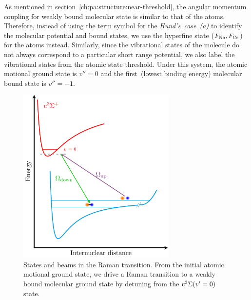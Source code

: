 As mentioned in section~\ref{ch:pa:structure:near-threshold},
the angular momentum coupling for weakly bound molecular state is similar to that of the atoms.
Therefore, instead of using the term symbol for the \textit{Hund's~case~(a)}
to identify the molecular potential and bound states,
we use the hyperfine state ($F_{\mathrm{Na}}, F_{\mathrm{Cs}}$) for the atoms instead.
Similarly, since the vibrational states of the molecule do not always correspond to
a particular short range potential, we also label the vibrational states
from the atomic state threshold.
Under this system, the atomic motional ground state is $v''=0$ and
the first~(lowest binding energy) molecular bound state is $v''=-1$.

\begin{figure}
  \centering
  \includegraphics[width=0.7\textwidth]{figures/raman_spectroscopy_scheme.pdf}
  \caption[Raman transition energy diagram]{
    States and beams in the Raman transition.
    From the initial atomic motional ground state,
    we drive a Raman transition to a weakly bound molecular ground state
    by detuning from the $\mathrm{c^3\Sigma}{\left({v'=0}\right)}$ state.
    \label{fig:raman-spectroscopy:scheme}}
\end{figure}

